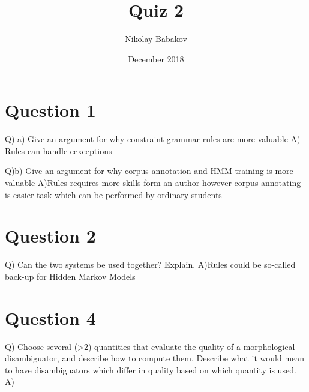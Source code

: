 \documentclass{article}
\title{Quiz 2}
\author{Nikolay Babakov}
\date{December 2018}
\begin{document}
\maketitle

\section{Question 1}
Q) a) Give an argument for why constraint grammar rules are more valuable
A) Rules can handle ecxceptions

Q)b) Give an argument for why corpus annotation and HMM training is more valuable
A)Rules requires more skills form an author however corpus annotating is easier task which can be performed by ordinary students

\section{Question 2}
Q) Can the two systems be used together? Explain.
A)Rules could be so-called back-up for Hidden Markov Models

\section{Question 4}
Q) Choose several (>2) quantities that evaluate the quality of a morphological disambiguator, and describe how to compute them. Describe what it would mean to have disambiguators which differ in quality based on which quantity is used.
A) 
\end{document}
